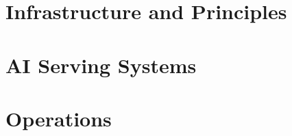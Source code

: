 \documentclass[11pt,oneside]{book}
\begin{document}
\frontmatter





\cleardoublepage
{}
{\hypersetup{linkcolor=tbbink}\tableofcontents}

\mainmatter

\part{Infrastructure and Principles}







\part{AI Serving Systems}






\part{Operations}




\end{document}
